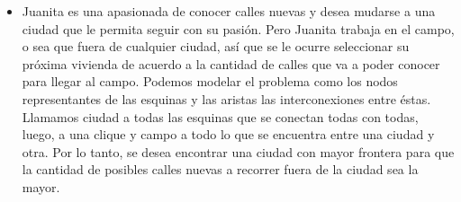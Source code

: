 \begin{itemize}
\item Juanita es una apasionada de conocer calles nuevas y desea mudarse a una ciudad que le permita seguir con su pasión. Pero Juanita trabaja en el campo, o sea que fuera de cualquier ciudad, así que se le ocurre seleccionar su próxima vivienda de acuerdo a la cantidad de calles que va a poder conocer para llegar al campo. Podemos modelar el problema como los nodos representantes de las esquinas y las aristas las interconexiones entre éstas. Llamamos ciudad a todas las esquinas que se conectan todas con todas, luego, a una clique y campo a todo lo que se encuentra entre una ciudad y otra. Por lo tanto, se desea encontrar una ciudad con mayor frontera para que la cantidad de posibles calles nuevas a recorrer fuera de la ciudad sea la mayor.

\end{itemize}

